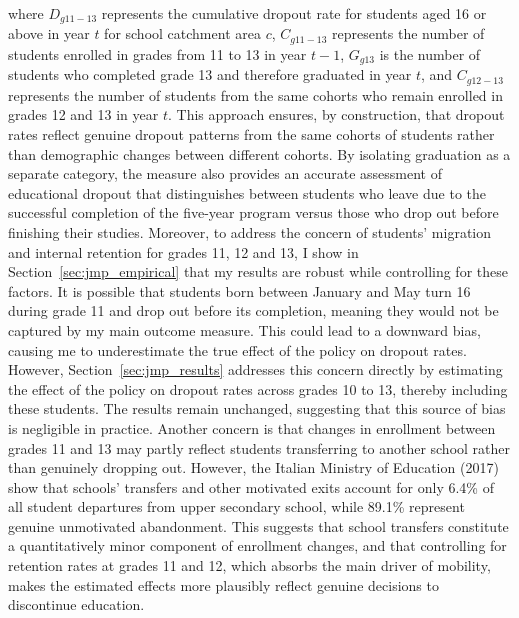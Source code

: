 \documentclass[12pt]{article}
\theoremstyle{plain}
\theoremstyle{plain}
\theoremstyle{plain}
\theoremstyle{definition}
\theoremstyle{plain}
\theoremstyle{definition}
\theoremstyle{plain}
\theoremstyle{remark}
\theoremstyle{definition}
\theoremstyle{definition}
\theoremstyle{plain}
\begin{document}
where $D_{g11-13}$ represents the cumulative dropout rate for students aged 16 or above in year $t$ for school catchment area $c$, $C_{g11-13}$ represents the number of students enrolled in grades from 11 to 13 in year $t-1$, $G_{g13}$ is the number of students who completed grade 13 and therefore graduated in year $t$, and $C_{g12-13}$ represents the number of students from the same cohorts who remain enrolled in grades 12 and 13 in year $t$. This approach ensures, by construction, that dropout rates reflect genuine dropout patterns from the same cohorts of students rather than demographic changes between different cohorts. By isolating graduation as a separate category, the measure also provides an accurate assessment of educational dropout that distinguishes between students who leave due to the successful completion of the five-year program versus those who drop out before finishing their studies. Moreover, to address the concern of students' migration and internal retention for grades 11, 12 and 13, I show in Section~\ref{sec:jmp_empirical} that my results are robust while controlling for these factors. It is possible that students born between January and May turn 16 during grade 11 and drop out before its completion, meaning they would not be captured by my main outcome measure. This could lead to a downward bias, causing me to underestimate the true effect of the policy on dropout rates. However, Section~\ref{sec:jmp_results} addresses this concern directly by estimating the effect of the policy on dropout rates across grades 10 to 13, thereby including these students. The results remain unchanged, suggesting that this source of bias is negligible in practice. Another concern is that changes in enrollment between grades 11 and 13 may partly reflect students transferring to another school rather than genuinely dropping out. However, the Italian Ministry of Education (2017) show that schools' transfers and other motivated exits account for only 6.4\% of all student departures from upper secondary school, while 89.1\% represent genuine unmotivated abandonment. This suggests that school transfers constitute a quantitatively minor component of enrollment changes, and that controlling for retention rates at grades 11 and 12, which absorbs the main driver of mobility, makes the estimated effects more plausibly reflect genuine decisions to discontinue education.  \par



\FloatBarrier
\end{document}
